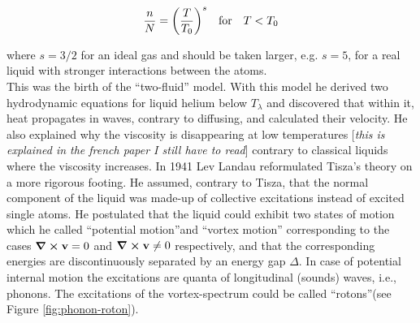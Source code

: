 \documentclass[11pt,a4paper,twoside]{article}
\renewcommand{\vec}[1]{\bm{\mathrm{#1}}}
\begin{document}
		\begin{align}
			\frac{n}{N} = \qty(\frac{T}{T_0})^s \quad \text{for} \quad T<T_0
		\end{align}

		where $s=3/2$ for an ideal gas and should be taken larger, e.g. $s=5$, for a real liquid with stronger interactions between the atoms.\\
		
		This was the birth of the ``two-fluid'' model. With this model he derived two hydrodynamic equations for liquid helium below $T_\lambda$ and discovered that within it, heat propagates in waves, contrary to diffusing, and calculated their velocity. He also explained why the viscosity is disappearing at low temperatures [\emph{this is explained in the french paper I still have to read}] contrary to classical liquids where the viscosity increases. In 1941 Lev Landau reformulated Tisza's theory on a more rigorous footing. He assumed, contrary to Tisza, that the normal component of the liquid was made-up of collective excitations instead of excited single atoms. He postulated that the liquid could exhibit two states of motion which he called ``potential motion''and ``vortex motion'' corresponding to the cases $\curl{\vec{v}}=0$ and $\curl{\vec{v}} \neq 0$ respectively, and that the corresponding energies are discontinuously separated by an energy gap $\Delta$. In case of potential internal motion  the excitations are quanta of longitudinal (sounds) waves, i.e., phonons. The excitations of the vortex-spectrum could be called ``rotons''(see Figure \ref{fig:phonon-roton}).\\
\end{document}
